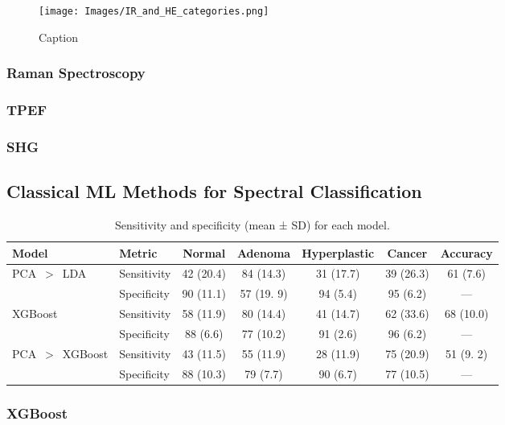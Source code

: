 \begin{figure}[htbp] 
    \centering 
    \texttt{[image: Images/IR\_and\_HE\_categories.png]} 
    \caption{Caption} \label{fig:my-label} 
\end{figure}

\subsubsection{Raman Spectroscopy}
\subsubsection{TPEF}
\subsubsection{SHG}

\subsection{Classical ML Methods for Spectral Classification}

\begin{table}[ht] \centering \caption{Sensitivity and specificity (mean ± SD)
for each model.} \label{tab:model_performance} \begin{tabular}{@{}l l c c c c
c@{}} \toprule Model & Metric & Normal & Adenoma & Hyperplastic & Cancer &
Accuracy \\ \midrule \multirow{2}{*}{PCA~$>$~LDA} & Sensitivity & 42 (20.4) & 84
(14.3) & 31 (17.7) & 39 (26.3) & 61 (7.6) \\ & Specificity & 90 (11.1) & 57 (19.
9) & 94 (5.4) & 95 (6.2) & — \\ \midrule \multirow{2}{*}{XGBoost} & Sensitivity
& 58 (11.9) & 80 (14.4) & 41 (14.7) & 62 (33.6) & 68 (10.0) \\ & Specificity &
88 (6.6) & 77 (10.2) & 91 (2.6) & 96 (6.2) & — \\ \midrule \multirow{2}{*}{PCA~$>$~XGBoost} & Sensitivity & 43 (11.5) & 55 (11.9) & 28 (11.9) & 75 (20.9) & 51 (9.
2) \\ & Specificity & 88 (10.3) & 79 (7.7) & 90 (6.7) & 77 (10.5) & — \\
\bottomrule \end{tabular} \end{table}


\subsubsection{XGBoost}
